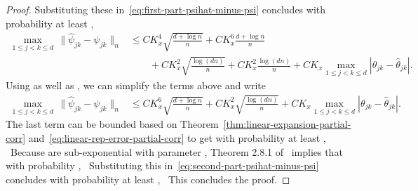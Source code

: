\documentclass{article}
\begin{document}
\begin{appendices}
\begin{proof}
\]
Substituting these in~\eqref{eq:first-part-psihat-minus-psi} concludes with probability at least  ,
\begin{equation}
\begin{split}
\max_{1\le j < k\le d}\,\|\widehat{\psi}_{jk} - \psi_{jk}\|_n &\le CK_x^4\sqrt{\frac{d + \log n}{n}} + CK_x^6\frac{d + \log n}{n}\\ &\qquad+ CK_x^2\sqrt{\frac{\log(dn)}{n}} + CK_x^2\frac{\log(dn)}{n} + CK_x\max_{1\le j < k\le d}|\theta_{jk} - \widehat{\theta}_{jk}|.
\end{split}
\end{equation}
Using
  as well as  , we can simplify the terms above and write
\begin{equation}\label{eq:second-part-psihat-minus-psi}
\begin{split}
\max_{1\le j < k\le d}\,\|\widehat{\psi}_{jk} - \psi_{jk}\|_n &\le CK_x^6\sqrt{\frac{d + \log n}{n}} + CK_x^2\sqrt{\frac{\log(dn)}{n}} + CK_x\max_{1\le j < k\le d}|\theta_{jk} - \widehat{\theta}_{jk}|.
\end{split}
\end{equation}
The last term can be bounded based on Theorem~\ref{thm:linear-expansion-partial-corr} and~\eqref{eq:linear-rep-error-partial-corr} to get with probability at least  ,
\ Because   are sub-exponential with parameter  , Theorem 2.8.1 of~\cite{Vershynin18} implies that with probability  ,
\ Substituting this in~\eqref{eq:second-part-psihat-minus-psi} concludes with probability at least  ,
\ This concludes the proof.
\end{proof}

\end{appendices}
\end{document}
